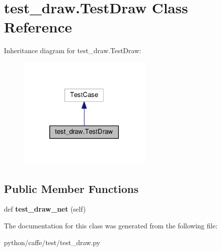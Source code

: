 \hypertarget{classtest__draw_1_1_test_draw}{}\section{test\+\_\+draw.\+Test\+Draw Class Reference}
\label{classtest__draw_1_1_test_draw}


Inheritance diagram for test\+\_\+draw.\+Test\+Draw\+:
\nopagebreak
\begin{figure}[H]
\begin{center}
\leavevmode
\includegraphics[width=185pt]{classtest__draw_1_1_test_draw__inherit__graph}
\end{center}
\end{figure}
\subsection*{Public Member Functions}
\begin{DoxyCompactItemize}
\item 
\mbox{\label{classtest__draw_1_1_test_draw_ae033249a9dfc678a20311f0a17b656d2}} 
def {\bfseries test\+\_\+draw\+\_\+net} (self)
\end{DoxyCompactItemize}


The documentation for this class was generated from the following file\+:\begin{DoxyCompactItemize}
\item 
python/caffe/test/test\+\_\+draw.\+py\end{DoxyCompactItemize}
